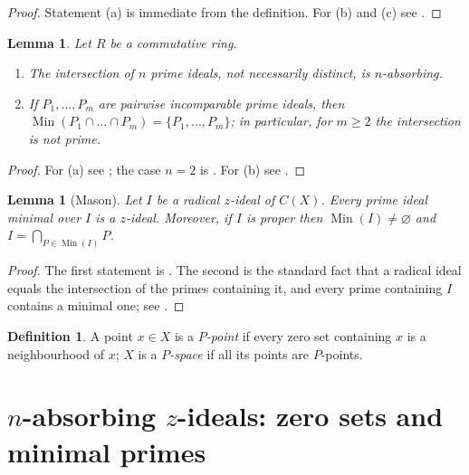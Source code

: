 \documentclass[11pt]{amsart}
\newtheorem{lemma}[theorem]{Lemma}
\theoremstyle{definition}
\newtheorem{definition}[theorem]{Definition}
\theoremstyle{remark}
\DeclareMathOperator{\Min}{Min}
\begin{document}
\begin{proof}
Statement \textup{(a)} is immediate from the definition. For
\textup{(b)} and \textup{(c)} see \cite[Chapters~2 and~14]{GillmanJerison}.
\end{proof}

\begin{lemma}
\label{lem:elementary}
Let $R$ be a commutative ring.
\begin{enumerate}[label=\textup{(\alph*)}]
\item The intersection of $n$ prime ideals, not necessarily distinct, is $n$-absorbing.
\item If $P_1,\dots,P_m$ are pairwise incomparable prime ideals, then
$\Min(P_1\cap\dots\cap P_m)=\{P_1,\dots,P_m\}$; in particular, for
$m\ge2$ the intersection is not prime.
\end{enumerate}
\end{lemma}

\begin{proof}
For \textup{(a)} see \cite{AndersonBadawi}; the case $n=2$ is
\cite[Theorem~2.3]{Badawi}. For \textup{(b)} see
\cite[Chapter~1]{AtiyahMacdonald}.
\end{proof}

\begin{lemma}[Mason]
\label{lem:min-z}
Let $I$ be a radical $z$-ideal of $C(X)$. Every prime ideal minimal over
$I$ is a $z$-ideal. Moreover, if $I$ is proper then $\Min(I)\neq\varnothing$
and $I=\bigcap_{P\in\Min(I)}P$.
\end{lemma}

\begin{proof}
The first statement is \cite[Theorem~1.1]{Mason}. The second is the
standard fact that a radical ideal equals the intersection of the
primes containing it, and every prime containing $I$ contains a minimal
one; see \cite[Chapter~1]{AtiyahMacdonald}.
\end{proof}

\begin{definition}
\label{def:P-point}
A point $x\in X$ is a \emph{$P$-point} if every zero set containing $x$
is a neighbourhood of $x$; $X$ is a \emph{$P$-space} if all its points
are $P$-points.
\end{definition}

\section{\texorpdfstring{$n$-absorbing $z$-ideals}{n-absorbing z-ideals}: zero sets and minimal primes}
\end{document}
